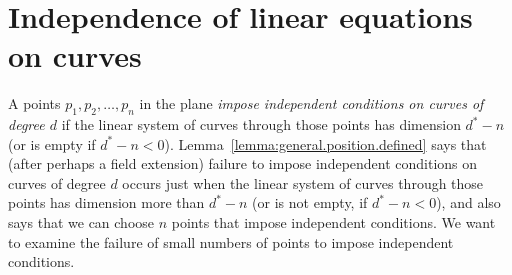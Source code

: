 \section{Independence of linear equations on curves}
A points \(p_1,p_2,\dots,p_n\) in the plane \emph{impose independent conditions on curves of degree \(d\)} if the linear system of curves through those points has dimension \(d^*-n\) (or is empty if \(d^*-n<0\)).
Lemma~\vref{lemma:general.position.defined} says that (after perhaps a field extension) failure to impose independent conditions on curves of degree \(d\) occurs just when the linear system of curves through those points has dimension more than \(d^*-n\) (or is not empty, if \(d^*-n<0\)), and also says that we can choose \(n\) points that impose independent conditions.
We want to examine the failure of small numbers of points to impose independent conditions.

